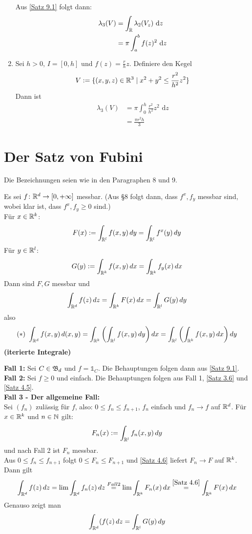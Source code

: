 \documentclass[a4paper,twoside,DIV15,BCOR12mm,chapterprefix=true,headings=onelinechapter]{scrbook}
\begin{document}
\begin{beispiel}
\begin{enumerate}
Aus \ref{Satz 9.1} folgt dann:
\begin{align*}
\lambda_3(V)&=\int_{\mathbb{R}} \lambda_2(V_z)\text{ d}z\\
&= \pi\int_a^b f(z)^2\text{ d}z 
\end{align*}
\item Sei $h>0$, $I=[0,h]$ und $f(z)=\frac rhz$. Definiere den Kegel
\[V:=\{(x,y,z)\in\mathbb{R}^3\mid x^2+y^2\le \frac{r^2}{h^2}z^2\}\]
Dann ist
\begin{align*}
\lambda_3(V)&=\pi\int_0^h \frac{r^2}{h^2}z^2\text{ d}z\\
&=\frac{\pi r^2h}3
\end{align*}
\end{enumerate}
\end{beispiel}

\chapter{Der Satz von Fubini}
Die Bezeichnungen seien wie in den Paragraphen 8 und 9.

\begin{satz}
\label{Satz 10.1}
Es sei \(f\colon\mathbb{R}^d\to[0,+\infty]\) messbar. (Aus \S 8 folgt dann, dass \(f^x,f_y\) messbar sind, wobei klar ist, dass \(f^x,f_y\geq 0\) sind.)\\
Für \(x\in\mathbb{R}^k\):
\[F(x):=\int_{\mathbb{R}^l}f(x,y)\,dy=\int_{\mathbb{R}^l}f^x(y)\,dy\]
Für \(y\in\mathbb{R}^l\):
\[G(y):=\int_{\mathbb{R}^k}f(x,y)\,dx=\int_{\mathbb{R}^k}f_y(x)\,dx\]
Dann sind $F,G$ messbar und 
\[\int_{\mathbb{R}^d}f(z)\,dz=\int_{\mathbb{R}^k}F(x)\,dx=\int_{\mathbb{R}^l}G(y)\,dy\]
also
\[ (\ast) \ \int_{\mdr^d}f(x,y)\,d(x,y)=\int_{\mdr^k}\left(\int_{\mdr^l}f(x,y)\,dy\right)dx=\int_{\mdr^l}\left(\int_{\mdr^k}f(x,y)\,dx\right)dy\]
\textbf{(iterierte Integrale)}
\end{satz}

\begin{beweis}
\textbf{Fall 1:} Sei \(C\in\mathfrak{B}_d\) und \(f=\mathds{1}_{C}\). Die Behauptungen folgen dann aus \ref{Satz 9.1}.\\
\textbf{Fall 2:} Sei \(f\geq 0\) und einfach. Die Behauptungen folgen aus Fall 1, \ref{Satz 3.6} und \ref{Satz 4.5}.\\
\textbf{Fall 3 - Der allgemeine Fall:}\\
 Sei \((f_n)\) zulässig für $f$, also: \(0\leq f_n\leq f_{n+1}\), \(f_n\) einfach und \(f_n\to f\) auf \(\mathbb{R}^d\).
Für \(x\in\mathbb{R}^k\) und \(n\in\mathbb{N}\) gilt:
\[F_n(x):=\int_{\mathbb{R}^l}f_n(x,y)\,dy\]
und nach Fall 2 ist \(F_n\) messbar. \\
Aus \(0\leq f_n\leq f_{n+1}\) folgt \(0\leq F_n\leq F_{n+1}\) und \ref{Satz 4.6} liefert \(F_n\to F\) auf \(\mathbb{R}^k\). Dann gilt
\[\int_{\mathbb{R}^d}f(z)\,dz = \lim \int_{\mathbb{R}^d}f_n(z)\,dz \overset{Fall 2}= \lim \int_{\mathbb{R}^k}F_n(x)\,dx \overset{\ref{Satz 4.6}}=\int_{\mathbb{R}^k}F(x)\,dx\]
Genauso zeigt man 
\[\int_{\mathbb{R}^d}(f(z)\,dz=\int_{\mathbb{R}^l}G(y)\,dy\]
\end{beweis}
\end{document}
